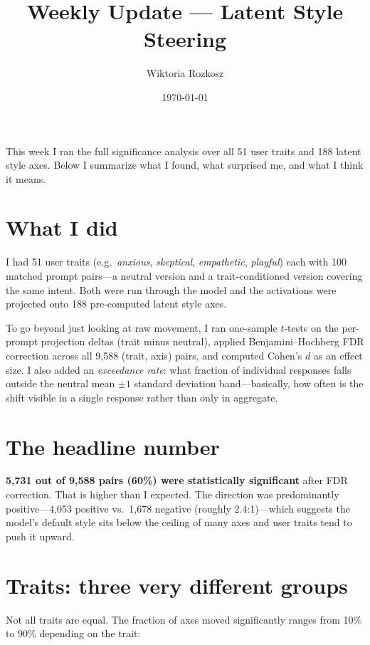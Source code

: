\documentclass[11pt]{article}
\title{Weekly Update --- Latent Style Steering}
\author{Wiktoria Rozkosz}
\date{\today}
\begin{document}
\maketitle

This week I ran the full significance analysis over all 51 user traits and 188 latent style axes. Below I summarize what I found, what surprised me, and what I think it means.

\section*{What I did}

I had 51 user traits (e.g.\ \textit{anxious}, \textit{skeptical}, \textit{empathetic}, \textit{playful}) each with 100 matched prompt pairs---a neutral version and a trait-conditioned version covering the same intent. Both were run through the model and the activations were projected onto 188 pre-computed latent style axes.

To go beyond just looking at raw movement, I ran one-sample $t$-tests on the per-prompt projection deltas (trait minus neutral), applied Benjamini--Hochberg FDR correction across all 9,588 (trait, axis) pairs, and computed Cohen's $d$ as an effect size. I also added an \textit{exceedance rate}: what fraction of individual responses falls outside the neutral mean $\pm 1$ standard deviation band---basically, how often is the shift visible in a single response rather than only in aggregate.

\section*{The headline number}

\textbf{5,731 out of 9,588 pairs (60\%) were statistically significant} after FDR correction. That is higher than I expected. The direction was predominantly positive---4,053 positive vs.\ 1,678 negative (roughly 2.4:1)---which suggests the model's default style sits below the ceiling of many axes and user traits tend to push it upward.

\section*{Traits: three very different groups}

Not all traits are equal. The fraction of axes moved significantly ranges from 10\% to 90\% depending on the trait:
\end{document}
